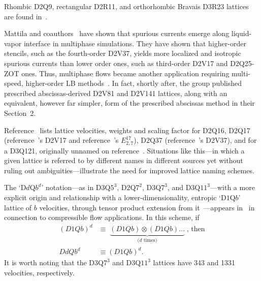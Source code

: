     Rhombic     D2Q9,     rectangular     D2R11,     and     orthorhombic     Bravais     D3R23     lattices      are      found
    in~\cite{2013-HegeleJr+PhilippiPC-JSciComput}.

    Mattila  and  coauthors~\cite{2013-MattilaKK+PhilippiPC-IntJModPhysC}  have  shown  that  spurious  currents  emerge   along
    liquid-vapor interface in multiphase simulations. They have shown that  higher-order  stencils,  such  as  the  fourth-order
    D2V37, yields more localized and isotropic spurious currents than lower order ones, such as third-order D2V17 and  D2Q25-ZOT
    ones.    Thus,    multiphase    flows    became    another    application    requiring    multi-speed,    higher-order    LB
    methods~\cite{2014-SiebertDN+MattilaKK-PhysRevE}.       In        fact,        shortly        after,        the        group
    published~\cite{2014-MattilaKK+PhilippiPC-SciWorldJ} pre\-scribed ab\-scis\-sas-de\-rived D2V81 and D2V141  lattices,  along
    with an equivalent, however far simpler, form of the prescribed abscissas method in their Section~2.

    Reference~\cite{2014-MengJ+ZhangY-JComputPhys} lists lattice  velocities,  weights  and  scaling  factor  for  D2Q16,  D2Q17
    (reference~\cite{2007-SiebertDN+PhilippiPC-IntJModPhysC}'s D2V17 and reference~\cite{2010-ShanX-PhysRevE}'s $E_{2,7}^{17}$),
    D2Q37   (reference~\cite{2006-PhilippiPC+SurmasR-PhysRevE}'s   D2V37),   and   for   a   D3Q121,   originally   unnamed   on
    reference~\cite{2008-NieX+ChenH-PhysRevE}. Situations like this---in which a given lattice is referred to by different names
    in different sources yet without ruling out ambiguities---illustrate the need for improved lattice naming schemes.

    The `D$d$Q$b^d$' notation---as in D$3$Q$5^3$, D$2$Q$7^2$, D$3$Q$7^3$, and D$3$Q$11^3$---with  a  more  explicit  origin  and
    relationship with a lower-dimensionality, entropic `D$1$Q$b$' lattice of $b$ velocities, through  tensor  product  extension
    from         it~\cite{2006-ChikatamarlaSS+KarlinIV-PhysRevLett}---appears         in~\cite{2015-FrapolliN+KarlinIV-PhysRevE,
    2016-FrapolliN+KarlinIV-PhysRevE} in connection to compressible flow applications. In this scheme, if%
    \begin{align}
        (D1Qb)^d & \equiv \;\underbrace{(D1Qb) \otimes (D1Qb) \ldots}_{\mbox{($d$ times)}}\;\mbox{, then} \\
        DdQb^d   & \equiv (D1Qb)^d.
    \end{align}
    It is worth noting that the D$3$Q$7^3$ and D$3$Q$11^3$ lattices have 343 and 1331 velocities, respectively.

